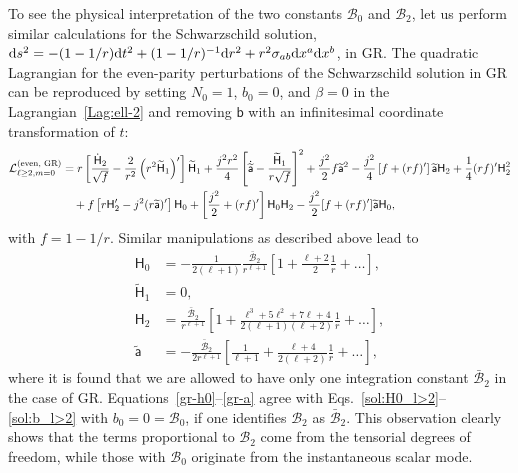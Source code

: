 \documentclass[aps,prd,preprintnumbers,superscriptaddress,nofootinbib,notitlepage]{revtex4-2}
\newcommand*{\D}{{\rm d}}
\begin{document}
To see the physical interpretation of the two constants $\mathcal B_0$ and $\mathcal B_2$,
let us perform similar calculations for the Schwarzschild solution,
$\D s^2=-(1-1/r)\D t^2+(1-1/r)^{-1}\D r^2+r^2\sigma_{ab}\D x^a\D x^b$,
in GR.
The quadratic Lagrangian for the even-parity perturbations of the Schwarzschild solution in GR can be reproduced by setting $N_0=1$, $b_0=0$, and $\beta=0$ in the Lagrangian~\eqref{Lag:ell-2} and removing $\mathsf{b}$ with an infinitesimal coordinate transformation of $t$:
\begin{align}
  {\cal L}_{\ell\ge 2,m=0}^{(\textrm{even, GR})}&=r
  \left[\frac{\dot{\mathsf{H}}_2}{\sqrt{f}}
  -\frac{2}{r^2}\left(r^2\widetilde{\mathsf{H}}_1\right)'
  \right]\widetilde{\mathsf{H}}_1
  +\frac{j^2r^2}{4}\left[
  \dot{\widetilde{\mathsf{a}}}
  -\frac{\widetilde{\mathsf{H}}_1}{r\sqrt{f}}
  \right]^2
  +\frac{j^2}{2}f\widetilde{\mathsf{a}}^2-\frac{j^2}{4}\left[f+(rf)'\right]
  \widetilde{\mathsf{a}}\mathsf{H}_2+\frac{1}{4}(rf)'\mathsf{H}_2^2
  \notag\\ &\quad
  +  f\left[
  r\mathsf{H}_2'-j^2(r\widetilde{\mathsf{a}})'
  \right]\mathsf{H}_0
  +\left[\frac{j^2}{2}+(rf)'\right]\mathsf{H}_0\mathsf{H}_2
  -\frac{j^2}{2}[f+(rf)']\widetilde{\mathsf{a}}\mathsf{H}_0,\label{Lag:ell-2gr}
  \end{align}
with $f=1-1/r$.
Similar manipulations as described above lead to
\begin{align}
    \mathsf{H}_0&=-\frac{1}{2(\ell+1)}\frac{\bar{\mathcal{B}}_2}{r^{\ell+1}}\left[1+\frac{\ell+2}{2}\frac{1}{r}+\dots\right],\label{gr-h0}\\
    \widetilde{\mathsf{H}}_1&=0,\\
    \mathsf{H}_2&=\frac{\bar{\mathcal{B}}_2}{r^{\ell+1}}\left[1+\frac{\ell^3+5\ell^2+7\ell+4}{2(\ell+1)(\ell+2)}\frac{1}{r}+\dots\right],\\
    \widetilde{\mathsf{a}}&=-\frac{\bar{\mathcal{B}}_2}{2r^{\ell+1}}\left[\frac{1}{\ell+1}+\frac{\ell+4}{2(\ell+2)}\frac{1}{r}+\dots\right]\label{gr-a},
\end{align}
where it is found that we are allowed to have only one integration constant $\bar{\mathcal{B}}_2$ in the case of GR.
Equations~\eqref{gr-h0}--\eqref{gr-a} agree with Eqs.~\eqref{sol:H0_l>2}--\eqref{sol:b_l>2} with $b_0=0=\mathcal{B}_0$, if one identifies $\mathcal{B}_2$ as $\bar{\mathcal{B}}_2$.
This observation clearly shows that the terms proportional to $\mathcal{B}_2$ come from the tensorial degrees of freedom, while those with $\mathcal{B}_0$ originate from the instantaneous scalar mode.
\end{document}
